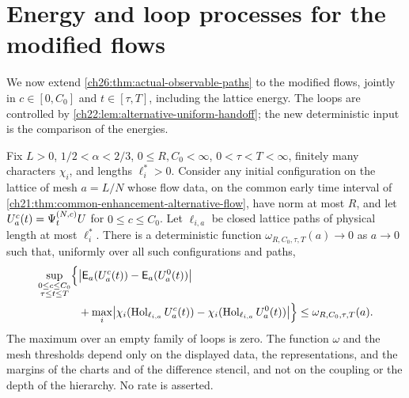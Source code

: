 \section{Energy and loop processes for the modified flows}\label{ch26:sec:alternative-observable-paths-addendum}

We now extend \cref{ch26:thm:actual-observable-paths} to the modified flows, jointly in $c\in[0,C_0]$ and $t\in[\tau,T]$, including the lattice energy. The loops are controlled by \cref{ch22:lem:alternative-uniform-handoff}; the new deterministic input is the comparison of the energies.

\begin{lemma}\label{ch26:lem:alternative-energy-handoff}
Fix $L>0$, $1/2<\alpha<2/3$, $0\le R,C_0<\infty$, $0<\tau<T<\infty$, finitely many characters $\chi_i$, and lengths $\ell_i^*>0$. Consider any initial configuration on the lattice of mesh $a=L/N$ whose flow data, on the common early time interval of \cref{ch21:thm:common-enhancement-alternative-flow}, have norm at most $R$, and let $U^c_a(t)=\Psi^{(N,c)}_tU$ for $0\le c\le C_0$. Let $\ell_{i,a}$ be closed lattice paths of physical length at most $\ell_i^*$. There is a deterministic function $\omega_{R,C_0,\tau,T}(a)\to0$ as $a\to0$ such that, uniformly over all such configurations and paths,
\[
 \begin{split}
 \sup_{\substack{0\le c\le C_0\\\tau\le t\le T}}\Bigl\{&\bigl\lvert\mathsf E_a(U^c_a(t))-\mathsf E_a(U^0_a(t))\bigr\rvert\\
 &+\max_i\bigl\lvert\chi_i(\operatorname{Hol}_{\ell_{i,a}}U^c_a(t))-\chi_i(\operatorname{Hol}_{\ell_{i,a}}U^0_a(t))\bigr\rvert\Bigr\}\le\omega_{R,C_0,\tau,T}(a).
 \end{split}
\]
The maximum over an empty family of loops is zero. The function $\omega$ and the mesh thresholds depend only on the displayed data, the representations, and the margins of the charts and of the difference stencil, and not on the coupling or the depth of the hierarchy. No rate is asserted.
\end{lemma}

